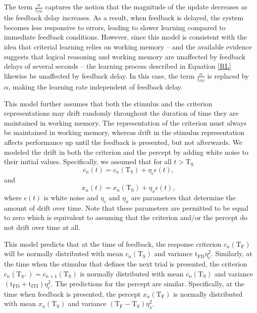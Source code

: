 \documentclass[doc, floatsintext]{apa7}
\begin{document}
The term $\frac{\alpha}{t_{FD}}$ captures the notion that
the magnitude of the update decreases as the feedback delay
increases.  As a result, when feedback is delayed, the
system becomes less responsive to errors, leading to slower
learning compared to immediate feedback conditions. However,
since this model is consistent with the idea that criterial
learning relies on working memory -- and the available
evidence suggests that logical reasoning and working memory
are unaffected by feedback delays of several seconds
\parencite[e.g., in one-dimensional rule-based category
learning tasks;][]{ell2009critrial, MaddoxAshbyBohil2003,
MaddoxIng2005} -- the learning process described in Equation
\ref{RL} likewise be unaffected by feedback delay. In this
case, the term $\frac{\alpha}{t_{FD}}$ is replaced by
$\alpha$, making the learning rate independent of feedback
delay.

This model further assumes that both the stimulus and the
criterion representations may drift randomly throughout the
duration of time they are maintained in working memory. The
representation of the criterion must always be maintained in
working memory, whereas drift in the stimulus representation
affects performance up until the feedback is presented, but
not afterwards. We modeled the drift in both the criterion
and the percept by adding white noise to their initial
values. Specifically, we assumed that for all
$t>\text{T}_\text{S}$
\begin{equation}
  c_n(t) = c_n(\text{T}_\text{S}) + \eta_c \epsilon(t),
  \label{eq:criterion}
\end{equation}
and
\begin{equation}
  x_n(t) = x_n(\text{T}_\text{S}) + \eta_x \epsilon(t),
  \label{eq:percept}
\end{equation}
where $\epsilon(t)$ is white noise and $\eta_c$ and $\eta_x$
are parameters that determine the amount of drift over time.
Note that these parameters are permitted to be equal to zero
which is equivalent to assuming that the criterion and/or
the percept do not drift over time at all.

This model predicts that at the time of feedback, the
response criterion $c_n(\text{T}_\text{F})$ will be normally
distributed with mean $c_n(\text{T}_\text{S})$ and variance
$\text{t}_\text{FD} \eta_c^2$. Similarly, at the time when
the stimulus that defines the next trial is presented, the
criterion $c_n(\text{T}_{\text{S}^+}) =
c_{n+1}(\text{T}_\text{S})$ is normally distributed with
mean $c_n(\text{T}_\text{S})$ and variance
$(\text{t}_\text{FD}+\text{t}_\text{ITI}) \eta_c^2$. The
predictions for the percept are similar. Specifically, at
the time when feedback is presented, the percept
$x_n(\text{T}_\text{F})$ is normally distributed with mean
$x_n(\text{T}_\text{S})$ and variance
$(\text{T}_\text{F}-\text{T}_\text{S}) \eta_x^2$.
\end{document}
